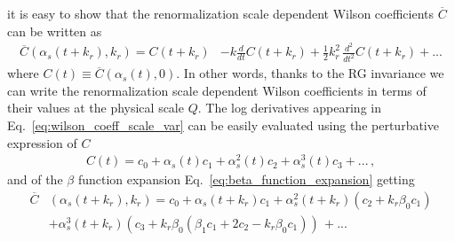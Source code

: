 it is easy to show that
the renormalization scale dependent Wilson coefficients $\overline{C}$ can be written as
\begin{align}
    \label{eq:wilson_coeff_scale_var}
    \overline{C}\left(\alpha_s\left(t+k_r\right),k_r\right) =
    C\left(t+k_r\right) &-  k\frac{d}{dt}C\left(t+k_r\right) 
    + \frac{1}{2} k_r^2\, \frac{d^2}{dt^2}C\left(t+k_r\right) + ...
\end{align}
where $C\left(t\right) \equiv \overline{C}\left(\alpha_s\left(t\right),0\right)$.
In other words, thanks to the RG invariance we can write the renormalization scale dependent Wilson coefficients
in terms of their values at the physical scale $Q$.
The log derivatives appearing in Eq.~\ref{eq:wilson_coeff_scale_var} can be easily evaluated using the 
perturbative expression of $C$ 
\begin{align}
    C\left(t\right) = 
    c_0 + \alpha_s\left(t\right)c_1 + \alpha_s^2\left(t\right)c_2 + \alpha_s^3\left(t\right)c_3 + ...\,,
\end{align}
and of the $\beta$ function expansion Eq.~\ref{eq:beta_function_expansion} getting
\begin{align}
    \label{eq:scale_varied_wilson_coeff}
    \overline{C}&\left(\alpha_s\left(t+k_r\right),k_r\right) = c_0 
    + \alpha_s\left(t+k_r\right)c_1 + \alpha_s^2\left(t+k_r\right)\left(c_2 + k_r\beta_0 c_1\right) \nonumber \\
    &+ \alpha_s^3\left(t+k_r\right)\left(c_3 + k_r\beta_0\left(\beta_1c_1 +2c_2 - k_r\beta_0 c_1\right)\right)\, + ...
\end{align} 

